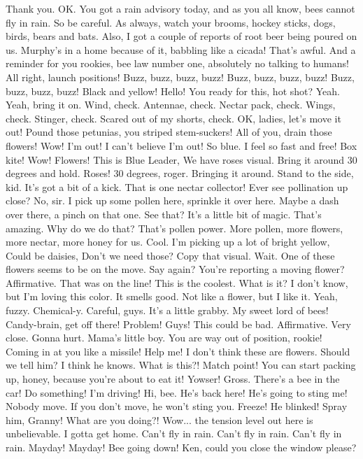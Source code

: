 \documentclass[a4paper,12pt]{article}
\begin{document}
Thank you.
OK.
You got a rain advisory today, and as you all know, bees cannot fly in rain.
So be careful. As always, watch your brooms, hockey sticks, dogs, birds, bears and bats.
Also, I got a couple of reports of root beer being poured on us.
Murphy's in a home because of it, babbling like a cicada!
That's awful.
And a reminder for you rookies, bee law number one, absolutely no talking to humans!
 All right, launch positions!
Buzz, buzz, buzz, buzz! Buzz, buzz, buzz, buzz! Buzz, buzz, buzz, buzz!
Black and yellow!
Hello!
You ready for this, hot shot?
Yeah. Yeah, bring it on.
Wind, check.
Antennae, check.
Nectar pack, check.
Wings, check.
Stinger, check.
Scared out of my shorts, check.
OK, ladies,
let's move it out!
Pound those petunias, you striped stem-suckers!
All of you, drain those flowers!
Wow! I'm out!
I can't believe I'm out!
So blue.
I feel so fast and free!
Box kite!
Wow!
Flowers!
This is Blue Leader, We have roses visual.
Bring it around 30 degrees and hold.
Roses!
30 degrees, roger. Bringing it around.
Stand to the side, kid.
It's got a bit of a kick.
That is one nectar collector!
Ever see pollination up close?
No, sir.
I pick up some pollen here, sprinkle it over here. Maybe a dash over there, a pinch on that one.
See that? It's a little bit of magic.
That's amazing. Why do we do that?
That's pollen power. More pollen, more flowers, more nectar, more honey for us.
Cool.
I'm picking up a lot of bright yellow, Could be daisies, Don't we need those?
Copy that visual.
Wait. One of these flowers seems to be on the move.
Say again? You're reporting a moving flower?
Affirmative.
That was on the line!
This is the coolest. What is it?
I don't know, but I'm loving this color.
It smells good.
Not like a flower, but I like it.
Yeah, fuzzy.
Chemical-y.
Careful, guys. It's a little grabby.
My sweet lord of bees!
Candy-brain, get off there!
Problem!
Guys!
This could be bad.
Affirmative.
Very close.
Gonna hurt.
Mama's little boy.
You are way out of position, rookie!
Coming in at you like a missile!
Help me!
I don't think these are flowers.
Should we tell him?
I think he knows.
What is this?!
Match point!
You can start packing up, honey, because you're about to eat it!
Yowser!
Gross.
There's a bee in the car!
Do something!
I'm driving!
Hi, bee.
He's back here!
He's going to sting me!
Nobody move. If you don't move, he won't sting you. Freeze!
He blinked!
Spray him, Granny!
What are you doing?!
Wow... the tension level out here is unbelievable.
I gotta get home.
Can't fly in rain. Can't fly in rain. Can't fly in rain.
Mayday! Mayday! Bee going down!
Ken, could you close the window please?
\end{document}
